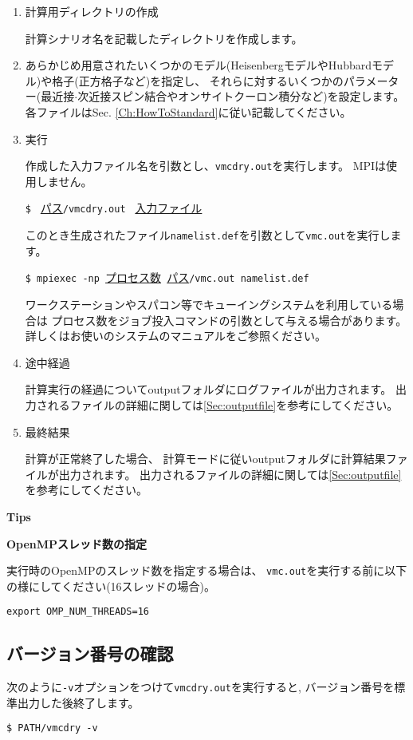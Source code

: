  \begin{enumerate}
   \item  計算用ディレクトリの作成

計算シナリオ名を記載したディレクトリを作成します。

   \item  {}

あらかじめ用意されたいくつかのモデル(HeisenbergモデルやHubbardモデル)や格子(正方格子など)を指定し、
それらに対するいくつかのパラメーター(最近接$\cdot$次近接スピン結合やオンサイトクーロン積分など)を設定します。
各ファイルはSec. \ref{Ch:HowToStandard}に従い記載してください。

 \item  実行

作成した入力ファイル名を引数とし、\verb|vmcdry.out|を実行します。
MPIは使用しません。

\verb|$ | \underline{パス}\verb|/vmcdry.out | \underline{入力ファイル} 

このとき生成されたファイル\verb|namelist.def|を引数として\verb|vmc.out|を実行します。

\verb|$ mpiexec -np |\underline{プロセス数}\verb| |\underline{パス}\verb|/vmc.out namelist.def|

ワークステーションやスパコン等でキューイングシステムを利用している場合は
プロセス数をジョブ投入コマンドの引数として与える場合があります。
詳しくはお使いのシステムのマニュアルをご参照ください。

\item 途中経過

計算実行の経過についてoutputフォルダにログファイルが出力されます。
出力されるファイルの詳細に関しては\ref{Sec:outputfile}を参考にしてください。

\item 最終結果

計算が正常終了した場合、
計算モードに従いoutputフォルダに計算結果ファイルが出力されます。
出力されるファイルの詳細に関しては\ref{Sec:outputfile}を参考にしてください。
\end{enumerate}

\begin{screen}
\Large 
{\bf Tips}
\normalsize

{\bf OpenMPスレッド数の指定}

実行時のOpenMPのスレッド数を指定する場合は、
\verb|vmc.out|を実行する前に以下の様にしてください(16スレッドの場合)。
\begin{verbatim}
export OMP_NUM_THREADS=16
\end{verbatim}

\end{screen}

\subsection{バージョン番号の確認}

次のように\verb|-v|オプションをつけて\verb|vmcdry.out|を実行すると, 
バージョン番号を標準出力した後終了します。

\begin{verbatim}
$ PATH/vmcdry -v
\end{verbatim}


